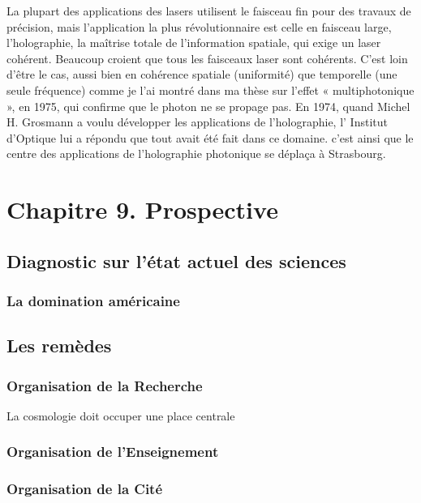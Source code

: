 \documentclass[a4paper,12pt]{article}
\begin{document}
La plupart des applications des lasers utilisent le faisceau fin pour des travaux de précision, mais l'application la plus révolutionnaire est celle en faisceau large, l'holographie, la maîtrise totale de l'information spatiale, qui exige un laser cohérent. Beaucoup croient que tous les faisceaux laser sont cohérents. C'est loin d'être le cas, aussi bien en cohérence spatiale (uniformité) que temporelle (une seule fréquence) comme je l'ai montré dans ma thèse sur l'effet « multiphotonique », en 1975, qui confirme que le photon ne se propage pas. En 1974, quand Michel H. Grosmann a voulu développer les applications de l'holographie, l' Institut d'Optique lui a répondu que tout avait été fait dans ce domaine. c'est ainsi que le centre des applications de l'holographie photonique se déplaça à Strasbourg.







\section{Chapitre 9. Prospective}

\subsection {Diagnostic sur l'état actuel des sciences}
\subsubsection{La domination américaine}



\subsection {Les remèdes} 
\subsubsection {Organisation de la Recherche}
La cosmologie doit occuper une place centrale
\subsubsection {Organisation de l'Enseignement}
\subsubsection {Organisation de la Cité}
\end{document}
